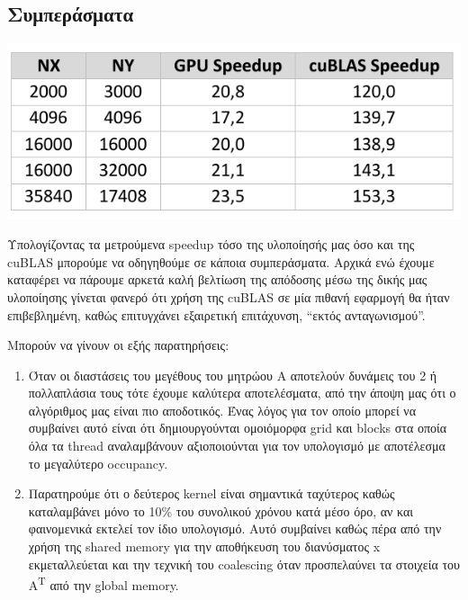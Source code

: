 \subsection*{Συμπεράσματα}

\begin{center}
    \includegraphics[scale=0.9]{./figures/2_tnv/speed_new}
\end{center}

\noindent Υπολογίζοντας τα μετρούμενα speedup τόσο της υλοποίησής μας όσο και της cuBLAS μπορούμε να οδηγηθούμε σε κάποια συμπεράσματα. Αρχικά ενώ έχουμε καταφέρει να πάρουμε αρκετά καλή βελτίωση της απόδοσης μέσω της δικής μας υλοποίησης γίνεται φανερό ότι χρήση της cuBLAS σε μία πιθανή εφαρμογή θα ήταν επιβεβλημένη, καθώς επιτυγχάνει εξαιρετική επιτάχυνση, ``εκτός ανταγωνισμού''.

\noindent Μπορούν να γίνουν οι εξής παρατηρήσεις:

\begin{enumerate}
    \item Όταν οι διαστάσεις του μεγέθους του μητρώου Α αποτελούν δυνάμεις του 2 ή πολλαπλάσια τους τότε έχουμε καλύτερα αποτελέσματα, από την άποψη μας ότι ο αλγόριθμος μας είναι πιο αποδοτικός. Ένας λόγος για τον οποίο μπορεί να συμβαίνει αυτό είναι ότι δημιουργούνται ομοιόμορφα grid και blocks στα οποία όλα τα thread αναλαμβάνουν αξιοποιούνται για τον υπολογισμό με αποτέλεσμα το μεγαλύτερο occupancy.
    
    \item Παρατηρούμε ότι ο δεύτερος kernel είναι σημαντικά ταχύτερος καθώς καταλαμβάνει μόνο το 10\% του συνολικού χρόνου κατά μέσο όρο, αν και φαινομενικά εκτελεί τον ίδιο υπολογισμό. Αυτό συμβαίνει καθώς πέρα από την χρήση της shared memory για την αποθήκευση του διανύσματος x εκμεταλλεύεται και την τεχνική του coalescing όταν προσπελαύνει τα στοιχεία του Α\textsuperscript{T} από την global memory.
\end{enumerate}


